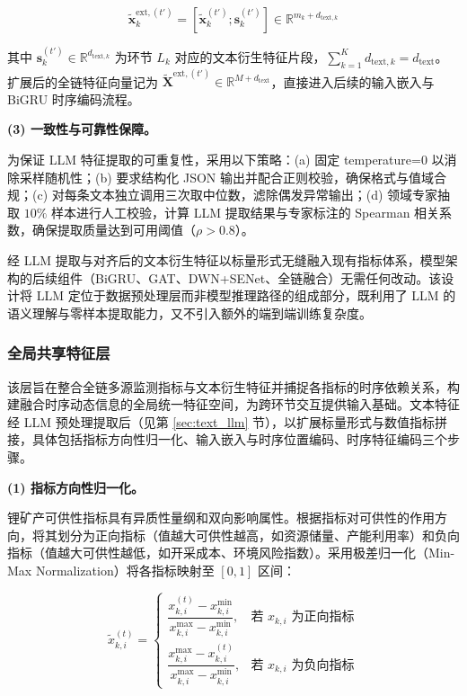 \begin{equation}
\tilde{\mathbf{x}}_k^{\text{ext},(t')} = \left[\tilde{\mathbf{x}}_k^{(t')}; \mathbf{s}_k^{(t')}\right] \in \mathbb{R}^{m_k + d_{\text{text},k}}
\end{equation}

其中 $\mathbf{s}_k^{(t')} \in \mathbb{R}^{d_{\text{text},k}}$ 为环节 $L_k$ 对应的文本衍生特征片段，$\sum_{k=1}^{K} d_{\text{text},k} = d_{\text{text}}$。扩展后的全链特征向量记为 $\tilde{\mathbf{X}}^{\text{ext},(t')} \in \mathbb{R}^{M + d_{\text{text}}}$，直接进入后续的输入嵌入与 BiGRU 时序编码流程。

\textbf{(3) 一致性与可靠性保障。}

为保证 LLM 特征提取的可重复性，采用以下策略：(a) 固定 temperature=0 以消除采样随机性；(b) 要求结构化 JSON 输出并配合正则校验，确保格式与值域合规；(c) 对每条文本独立调用三次取中位数，滤除偶发异常输出；(d) 领域专家抽取 $10\%$ 样本进行人工校验，计算 LLM 提取结果与专家标注的 Spearman 相关系数，确保提取质量达到可用阈值（$\rho > 0.8$）。

经 LLM 提取与对齐后的文本衍生特征以标量形式无缝融入现有指标体系，模型架构的后续组件（BiGRU、GAT、DWN+SENet、全链融合）无需任何改动。该设计将 LLM 定位于数据预处理层而非模型推理路径的组成部分，既利用了 LLM 的语义理解与零样本提取能力，又不引入额外的端到端训练复杂度。

\subsubsection{全局共享特征层}

该层旨在整合全链多源监测指标与文本衍生特征并捕捉各指标的时序依赖关系，构建融合时序动态信息的全局统一特征空间，为跨环节交互提供输入基础。文本特征经 LLM 预处理提取后（见第 \ref{sec:text_llm} 节），以扩展标量形式与数值指标拼接，具体包括指标方向性归一化、输入嵌入与时序位置编码、时序特征编码三个步骤。

\textbf{(1) 指标方向性归一化。}

锂矿产可供性指标具有异质性量纲和双向影响属性。根据指标对可供性的作用方向，将其划分为正向指标（值越大可供性越高，如资源储量、产能利用率）和负向指标（值越大可供性越低，如开采成本、环境风险指数）。采用极差归一化（Min-Max Normalization）将各指标映射至 $[0,1]$ 区间：

\begin{equation}
\tilde{x}_{k,i}^{(t)} =
\begin{cases}
\dfrac{x_{k,i}^{(t)} - x_{k,i}^{\min}}{x_{k,i}^{\max} - x_{k,i}^{\min}}, & \text{若 } x_{k,i} \text{ 为正向指标} \\[12pt]
\dfrac{x_{k,i}^{\max} - x_{k,i}^{(t)}}{x_{k,i}^{\max} - x_{k,i}^{\min}}, & \text{若 } x_{k,i} \text{ 为负向指标}
\end{cases}
\end{equation}

